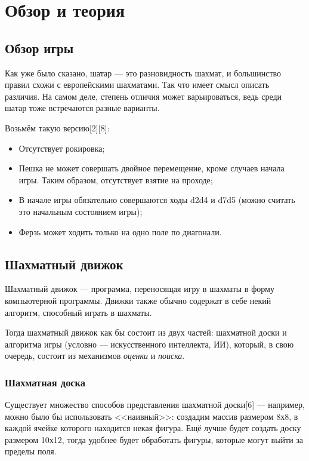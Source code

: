 {

	\chapter{Обзор и теория}
	
	\section{Обзор игры}
	
	Как уже было сказано, шатар --- это разновидность шахмат, и большинство правил схожи с европейскими шахматами. Так что имеет смысл описать различия.
	На самом деле, степень отличия может варьироваться, ведь среди шатар тоже встречаются разные варианты. 
	
	Возьмём такую версию[2][8]:
	
	\begin{itemize}
		\item Отсутствует рокировка;
		\item Пешка не может совершать двойное перемещение, кроме случаев начала игры. Таким образом, отсутствует взятие на проходе;
		\item В начале игры обязательно совершаются ходы d2d4 и d7d5 (можно считать это начальным состоянием игры);
		\item  Ферзь может ходить только на одно поле по диагонали.
	\end{itemize}
	
	\section{Шахматный движок}
	
	Шахматный движок --- программа, переносящая игру в шахматы в форму компьютерной программы. Движки также обычно содержат в себе некий алгоритм, способный играть в шахматы.
	
	Тогда шахматный движок как бы состоит из двух частей: шахматной доски и алгоритма игры (условно --- искусственного интеллекта, ИИ), который, в свою очередь, состоит из механизмов \textit{оценки} и \textit{поиска}.
	
	\subsection{Шахматная доска}
	
	Существует множество способов представления шахматной доски[6] --- например, можно было бы использовать <<наивный>>: создадим массив размером 8х8, в каждой ячейке которого находится некая фигура. Ещё лучше будет создать доску размером 10х12, тогда удобнее будет обработать фигуры, которые могут выйти за пределы поля.
	
}
